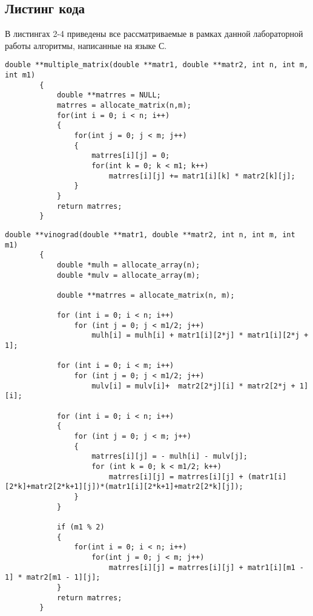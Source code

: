 \documentclass[a4paper, 14pt]{article}
\begin{document}
        \subsection{Листинг кода}
        В листингах 2-4 приведены все рассматриваемые в рамках данной лабораторной работы алгоритмы, написанные на языке С.
        \newpage
		\begin{lstlisting}[label=some-code,caption=Стандартный алгоритм]
		double **multiple_matrix(double **matr1, double **matr2, int n, int m, int m1)
		{
			double **matrres = NULL;
			matrres = allocate_matrix(n,m);
			for(int i = 0; i < n; i++)
			{
				for(int j = 0; j < m; j++)
				{
					matrres[i][j] = 0;
					for(int k = 0; k < m1; k++)
						matrres[i][j] += matr1[i][k] * matr2[k][j];
				}
			}
			return matrres;
		}
		\end{lstlisting}
		\begin{lstlisting}[label=some-code,caption=Алгоритм Винограда]
		double **vinograd(double **matr1, double **matr2, int n, int m, int m1)
		{
			double *mulh = allocate_array(n);
			double *mulv = allocate_array(m);
	
			double **matrres = allocate_matrix(n, m);

			for (int i = 0; i < n; i++)
				for (int j = 0; j < m1/2; j++)
					mulh[i] = mulh[i] + matr1[i][2*j] * matr1[i][2*j + 1];

			for (int i = 0; i < m; i++)
				for (int j = 0; j < m1/2; j++)
					mulv[i] = mulv[i]+  matr2[2*j][i] * matr2[2*j + 1][i];
	
			for (int i = 0; i < n; i++)
			{
				for (int j = 0; j < m; j++)
				{
					matrres[i][j] = - mulh[i] - mulv[j];
					for (int k = 0; k < m1/2; k++)
						matrres[i][j] = matrres[i][j] + (matr1[i][2*k]+matr2[2*k+1][j])*(matr1[i][2*k+1]+matr2[2*k][j]);
				}
			}
	
			if (m1 % 2)
			{
				for(int i = 0; i < n; i++)
					for(int j = 0; j < m; j++)
						matrres[i][j] = matrres[i][j] + matr1[i][m1 - 1] * matr2[m1 - 1][j];
			}
			return matrres;
		}
		\end{lstlisting}
		\newpage
\end{document}
